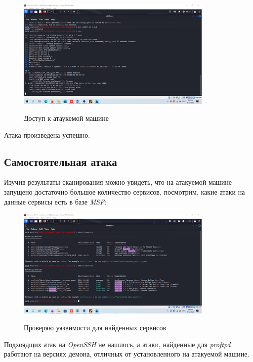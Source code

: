 \documentclass[a4paper]{article}
\begin{document}
  \begin{figure}[H]
    \centering
    \includegraphics[width=0.85\textwidth]{04_0078}
    \label{img:78}
    \caption{Доступ к атаукемой машине}
  \end{figure}

  Атака произведена успешно.

  \subsection{Самостоятельная атака}

  Изучив результаты сканирования можно увидеть, что на атакуемой машине запущено
  достаточно большое количество сервисов, посмотрим, какие атаки на данные сервисы
  есть в базе \textit{MSF}:

  \begin{figure}[H]
    \centering
    \includegraphics[width=0.85\textwidth]{04_0080}
    \label{img:79}
    \caption{Проверяю уязвимости для найденных сервисов}
  \end{figure}

  Подхоядщих атак на \textit{OpenSSH} не нашлось, а атаки, найденные
  для \textit{proftpd} работают на версиях демона, отличных от установленного на атакуемой машине.
\end{document}
